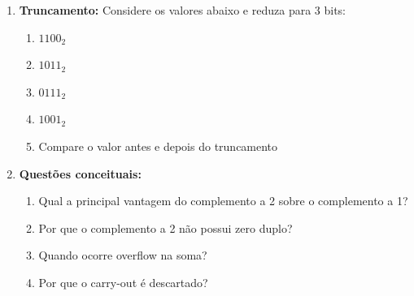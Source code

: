 \begin{enumerate}
    \item \textbf{Truncamento:}
          Considere os valores abaixo e reduza para 3 bits:

          \begin{enumerate}
              \item $1100_2$
              \item $1011_2$
              \item $0111_2$
              \item $1001_2$
              \item Compare o valor antes e depois do truncamento
          \end{enumerate}



    \item \textbf{Questões conceituais:}
          \begin{enumerate}
              \item Qual a principal vantagem do complemento a 2 sobre o complemento a 1?
              \item Por que o complemento a 2 não possui zero duplo?
              \item Quando ocorre overflow na soma?
              \item Por que o carry-out é descartado?
          \end{enumerate}

\end{enumerate}